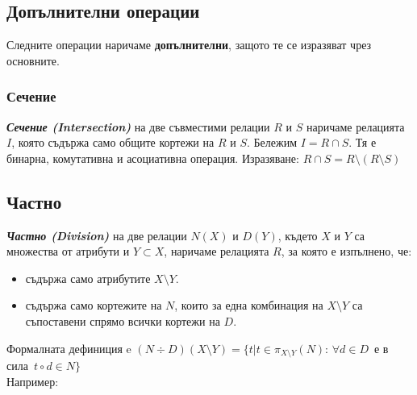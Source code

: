\documentclass[fleqn,12pt]{article}
\begin{document}
\subsection{Допълнителни операции}
Следните операции наричаме \textbf{допълнителни}, защото те се изразяват чрез основните.

\subsubsection{Сечение}
\textbf{\textit{Сечение (Intersection)}} на две съвместими релации $R$ и $S$ наричаме релацията $I$, която съдържа само общите кортежи на $R$ и $S$.
Бележим $I = R \cap S$.
Тя е бинарна, комутативна и асоциативна операция.
Изразяване: $R \cap S = R \setminus (R \setminus S)$

\subsection{Частно}
\textbf{\textit{Частно (Division)}} на две релации $N(X)$ и $D(Y)$, където $X$ и $Y$ са множества от атрибути и $Y \subset X$, наричаме релацията $R$, за която е изпълнено, че:
\begin{itemize}
    \item съдържа само атрибутите $X \setminus Y$.
    \item съдържа само кортежите на $N$, които за една комбинация на $X \setminus Y$ са съпоставени спрямо всички кортежи на $D$.
\end{itemize}


Формалната дефиниция e $(N \div D)(X \setminus Y) = \{t | t \in \pi_{X \setminus Y} (N) :\, \forall d \in D \,$ е в сила $\, t \circ d \in N \}$\\
Например:\\
\end{document}
